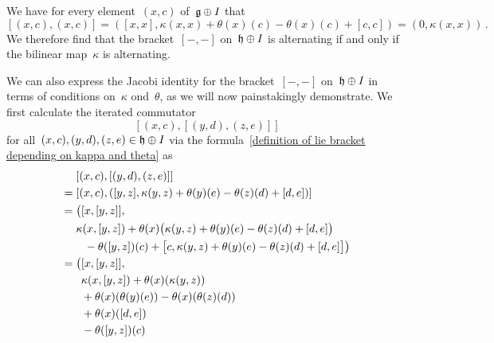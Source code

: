 \begin{fluff}
\begin{enumerate}
      We have for every element~$(x,c)$ of~$\mathfrak{g} \oplus I$ that
      \[
        [(x,c), (x,c)]
        =
        ( [x,x], \kappa(x,x) + \theta(x)(c) - \theta(x)(c) + [c,c] )
        =
        (0, \kappa(x,x) ) \,.
      \]
      We therefore find that the bracket~$[-,-]$ on~$\mathfrak{h} \oplus I$ is alternating if and only if the bilinear map~$\kappa$ is alternating.

      We can also express the Jacobi identity for the bracket~$[-,-]$ on~$\mathfrak{h} \oplus I$ in terms of conditions on~$\kappa$ ond~$\theta$, as we will now painstakingly demonstrate.
      We first calculate the iterated commutator
      \[
        [(x,c), [(y,d), (z,e)]]
      \]
      for all~$(x,c), (y,d), (z,e) \in \mathfrak{h} \oplus I$ via the formula~\eqref{definition of lie bracket depending on kappa and theta} as
      \begin{align}
        {}&
        [(x,c), [(y,d), (z,e)]]
        \notag
        \\
        ={}&
        [(x,c), ([y,z], \kappa(y,z) + \theta(y)(e) - \theta(z)(d) + [d,e])]
        \notag
        \\
        ={}&
        \bigl(
          [x, [y, z]], 
        \notag
        \\
        {}&
          \kappa( x, [y, z] )
          + \theta(x)
            \bigl(
              \kappa(y,z) + \theta(y)(e) - \theta(z)(d) + [d,e]
            \bigr)
        \notag
        \\
        {}&
        \hphantom{\biggl(}
          - \theta([y,z])(c)
          + \bigl[
              c,
              \kappa(y,z) + \theta(y)(e) - \theta(z)(d) + [d,e]
            \bigr]
        \bigr)
        \notag
        \\
        ={}&
        \smash{\bigl(}
          [x, [y, z]],
        \notag
        \\
        {}&
        \hphantom{\bigl(}
          \kappa( x, [y, z] )
          + \theta(x)( \kappa(y,z) )
        \label{ugly row 1}
        \\
        {}&
        \hphantom{\bigl(}
          + \theta(x)( \theta(y)(e) )
          - \theta(x)( \theta(z)(d) )
        \label{ugly row 2}
        \\
        {}&
        \hphantom{\bigl(}
          + \theta(x)( [d,e] )
        \label{ugly row 3}
        \\
        {}&
        \hphantom{\bigl(}
          - \theta( [y,z] )(c)
        \label{ugly row 4}
        \\

\end{align}
\end{enumerate}
\end{fluff}
